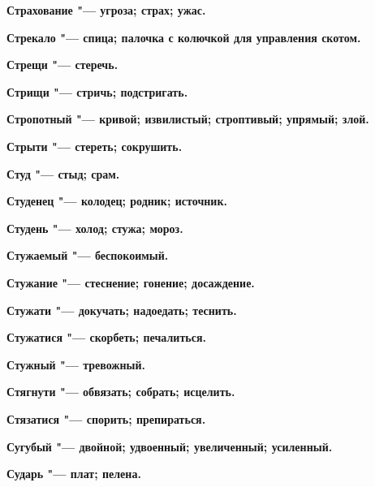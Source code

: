 \bfseries Страхование \normalfont{} "--- угроза; страх; ужас. 




\bfseries Стрекало \normalfont{} "--- спица; палочка с колючкой для управления скотом. 




\bfseries Стрещи \normalfont{} "--- стеречь. 




\bfseries Стрищи \normalfont{} "--- стричь; подстригать. 




\bfseries Стропотный \normalfont{} "--- кривой; извилистый; строптивый; упрямый; злой. 




\bfseries Стрыти \normalfont{} "--- стереть; сокрушить. 




\bfseries Студ \normalfont{} "--- стыд; срам. 




\bfseries Студенец \normalfont{} "--- колодец; родник; источник. 




\bfseries Студень \normalfont{} "--- холод; стужа; мороз. 




\bfseries Стужаемый \normalfont{} "--- беспокоимый. 




\bfseries Стужание \normalfont{} "--- стеснение; гонение; досаждение. 




\bfseries Стужати \normalfont{} "--- докучать; надоедать; теснить. 




\bfseries Стужатися \normalfont{} "--- скорбеть; печалиться. 




\bfseries Стужный \normalfont{} "--- тревожный. 




\bfseries Стягнути \normalfont{} "--- обвязать; собрать; исцелить. 




\bfseries Стязатися \normalfont{} "--- спорить; препираться. 




\bfseries Сугубый \normalfont{} "--- двойной; удвоенный; увеличенный; усиленный. 




\bfseries Сударь \normalfont{} "--- плат; пелена. 




